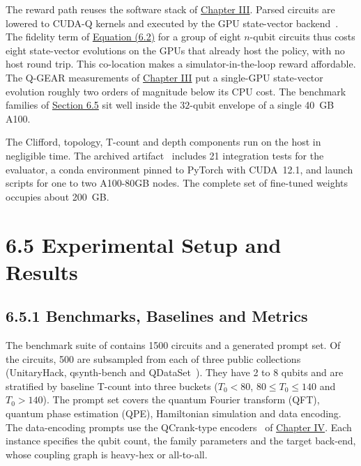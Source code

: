 \documentclass{report}
\theoremstyle{plain}
\theoremstyle{definition}
\theoremstyle{remark}
\begin{document}
The reward path reuses the software stack of \hyperref[ch:qgear]{Chapter III}. Parsed circuits are lowered to CUDA-Q kernels and executed by the GPU state-vector backend~\cite{kim2023cudaquantum}. The fidelity term of \hyperref[eq:syn:rubric]{Equation (6.2)} for a group of eight $n$-qubit circuits thus costs eight state-vector evolutions on the GPUs that already host the policy, with no host round trip. This co-location makes a simulator-in-the-loop reward affordable. The Q-GEAR measurements of \hyperref[ch:qgear]{Chapter III} put a single-GPU state-vector evolution roughly two orders of magnitude below its CPU cost. The benchmark families of \hyperref[sec:syn:results]{Section 6.5} sit well inside the $32$-qubit envelope of a single 40~GB A100.

The Clifford, topology, T-count and depth components run on the host in negligible time. The archived artifact~\cite{guo2026rubriqsoftware} includes 21 integration tests for the evaluator, a conda environment pinned to PyTorch with CUDA~12.1, and launch scripts for one to two A100-80GB nodes. The complete set of fine-tuned weights occupies about 200~GB.

\section{6.5 Experimental Setup and Results}\label{sec:syn:results}

\subsection{6.5.1 Benchmarks, Baselines and Metrics}\label{sec:syn:setup}

The benchmark suite of \cite{guo2026rubriq} contains 1500 circuits and a generated prompt set. Of the circuits, 500 are subsampled from each of three public collections (UnitaryHack, qsynth-bench and QDataSet~\cite{perrier2022qdataset}). They have 2 to 8 qubits and are stratified by baseline T-count into three buckets ($T_0<80$, $80\le T_0\le 140$ and $T_0>140$). The prompt set covers the quantum Fourier transform (QFT), quantum phase estimation (QPE), Hamiltonian simulation and data encoding. The data-encoding prompts use the QCrank-type encoders~\cite{balewski2024qcrank} of \hyperref[ch:qml]{Chapter IV}. Each instance specifies the qubit count, the family parameters and the target back-end, whose coupling graph is heavy-hex or all-to-all.
\end{document}
